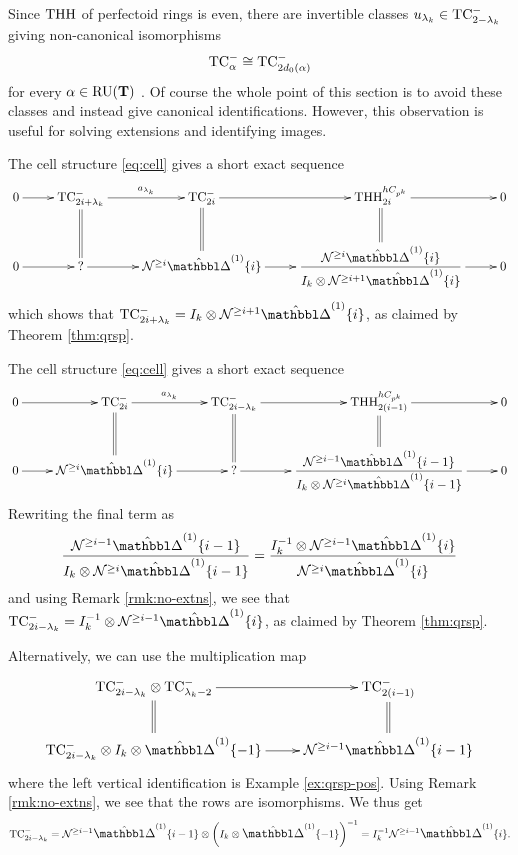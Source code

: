 \begin{remark}
  \label{rmk:no-extns}
  Since $\mathrm{THH}$ of perfectoid rings is even, there are invertible classes $u_{\lambda_k}\in\mathrm{TC}^-_{2-\lambda_k}$ giving non-canonical isomorphisms
  \[ \mathrm{TC}^-_\alpha \cong \mathrm{TC}^-_{2d_0(\alpha)} \]
  for every $\alpha\in\operatorname{RU}(\mathbf T)$ \cite[Proposition 4.2]{RiggenbachDoublePoints}. Of course the whole point of this section is to avoid these classes and instead give canonical identifications. However, this observation is useful for solving extensions and identifying images.
\end{remark}

\begin{example}
  \label{ex:qrsp-pos}
  The cell structure \eqref{eq:cell} gives a short exact sequence
  \[\xymatrix{
      0 \ar[r] & \TCmin_{2i+\lambda_k} \ar[r]^-{a_{\lambda_k}} \ar@{=}[d] & \TCmin_{2i} \ar[r] \ar@{=}[d] & \THH^{hC_{p^k}}_{2i} \ar[r] \ar@{=}[d] & 0\\
      0 \ar[r] & ? \ar[r] & \Nyg^{\ge i}\vprism\{i\} \ar[r] & \dfrac{\Nyg^{\ge i}\vprism\{i\}}{I_k\tnsr\Nyg^{\ge i+1}\vprism\{i\}} \ar[r] & 0
  }\]
  which shows that $\TCmin_{2i+\lambda_k}=I_k\tnsr\Nyg^{\ge i+1}\vprism\{i\}$, as claimed by Theorem \ref{thm:qrsp}.
\end{example}

\begin{example}
  The cell structure \eqref{eq:cell} gives a short exact sequence
  \[\xymatrix{
      0 \ar[r] & \TCmin_{2i} \ar[r]^-{a_{\lambda_k}} \ar@{=}[d] & \TCmin_{2i-\lambda_k} \ar[r] \ar@{=}[d] & \THH^{hC_{p^k}}_{2(i-1)} \ar[r] \ar@{=}[d] & 0\\
      0 \ar[r] & \Nyg^{\ge i}\vprism\{i\} \ar[r] & ? \ar[r] & \dfrac{\Nyg^{\ge i-1}\vprism\{i-1\}}{I_k\tnsr\Nyg^{\ge i}\vprism\{i-1\}} \ar[r] & 0
  }\]
  Rewriting the final term as
  \[
    \dfrac{\Nyg^{\ge i-1}\vprism\{i-1\}}{I_k\tnsr\Nyg^{\ge i}\vprism\{i-1\}} 
    =
    \dfrac{I_k^{-1}\tnsr\Nyg^{\ge i-1}\vprism\{i\}}{\Nyg^{\ge i}\vprism\{i\}} 
  \]
  and using Remark \ref{rmk:no-extns}, we see that $\TCmin_{2i-\lambda_k} = I_k^{-1}\tnsr\Nyg^{\ge i-1}\vprism\{i\}$, as claimed by Theorem \ref{thm:qrsp}.

  Alternatively, we can use the multiplication map
  \[\xymatrix{
      \TCmin_{2i-\lambda_k} \tnsr \TCmin_{\lambda_k-2} \ar[r] \ar@{=}[d] & \TCmin_{2(i-1)} \ar@{=}[d]\\
      \TCmin_{2i-\lambda_k} \tnsr I_k\tnsr\vprism\{-1\} \ar[r] & \Nyg^{\ge i-1}\vprism\{i-1\}
  }\]
  where the left vertical identification is Example \ref{ex:qrsp-pos}. Using Remark \ref{rmk:no-extns}, we see that the rows are isomorphisms. We thus get
  \[ \TCmin_{2i-\lambda_k} = \Nyg^{\ge i-1}\vprism\{i-1\}\tnsr\left(I_k\tnsr\vprism\{-1\}\right)^{-1} = I_k^{-1}\Nyg^{\ge i-1}\vprism\{i\}. \]
\end{example}

